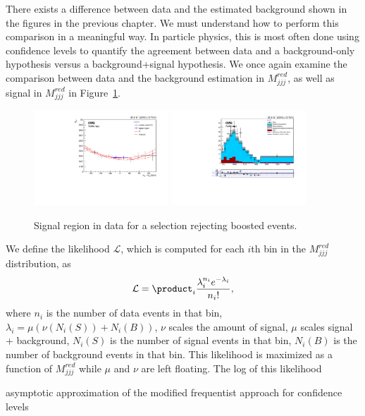 There exists a difference between data and the estimated background shown in the figures in the previous chapter. We must understand how to perform this comparison in a meaningful way. In particle physics, this is most often done using confidence levels to quantify the agreement between data and a background-only hypothesis versus a background+signal hypothesis. We once again examine the comparison between data and the background estimation in $M_{jjj}^{red}$, as well as signal in $M_{jjj}^{red}$ in Figure~\ref{fig:databoost2}.
\begin{figure}[h]
\centering
\includegraphics[width=0.45\textwidth]{F5/HH4b2p1SR_Fit_NRv1_unB1_boost_dEta2.pdf}
\includegraphics[width=0.45\textwidth]{F5/HH4b2p1_Plot_NRv1_unB1_boost_dEta2.pdf}
\caption{Signal region in data for a selection rejecting boosted events.}
\label{fig:databoost2}
\end{figure}
We define the likelihood $\mathcal{L}$, which is computed for each $i$th bin in the $M_{jjj}^{red}$ distribution, as 
\begin{equation}
\mathcal{L} = \product_{i} \frac{\lambda_{i}^{n_{i}} e^{-\lambda_{i}}}{n_{i}!},
\end{equation}
where $n_{i}$ is the number of data events in that bin, $\lambda_{i}=\mu (\nu(N_{i}(S)) + N_{i}(B))$, $\nu$ scales the amount of signal, $\mu$ scales signal + background, $N_{i}(S)$ is the number of signal events in that bin, $N_{i}(B)$ is the number of background events in that bin. This likelihood is maximized as a function of $M_{jjj}^{red}$ while $\mu$ and $\nu$ are left floating. The log of this likelihood 




asymptotic approximation of the modified frequentist approach for confidence levels